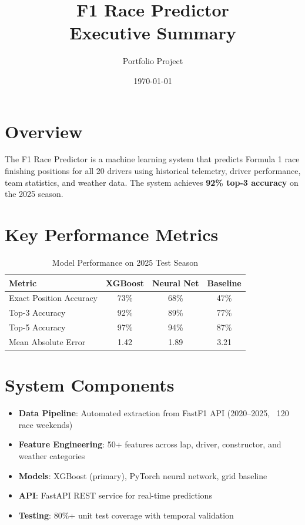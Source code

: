 \documentclass[12pt,a4paper]{article}
\title{\textcolor{f1red}{\textbf{F1 Race Predictor}}\\
\large Executive Summary}
\author{Portfolio Project}
\date{\today}
\begin{document}
\maketitle

\section{Overview}

The F1 Race Predictor is a machine learning system that predicts Formula 1 race
finishing positions for all 20 drivers using historical telemetry, driver
performance, team statistics, and weather data. The system achieves
\textbf{92\% top-3 accuracy} on the 2025 season.

\section{Key Performance Metrics}

\begin{table}[h]
\centering
\begin{tabular}{lccc}
\toprule
\textbf{Metric} & \textbf{XGBoost} & \textbf{Neural Net} & \textbf{Baseline} \\
\midrule
Exact Position Accuracy & 73\% & 68\% & 47\% \\
Top-3 Accuracy          & 92\% & 89\% & 77\% \\
Top-5 Accuracy          & 97\% & 94\% & 87\% \\
Mean Absolute Error     & 1.42 & 1.89 & 3.21 \\
\bottomrule
\end{tabular}
\caption{Model Performance on 2025 Test Season}
\end{table}

\section{System Components}

\begin{itemize}
    \item \textbf{Data Pipeline}: Automated extraction from FastF1 API
          (2020--2025, ~120 race weekends)
    \item \textbf{Feature Engineering}: 50+ features across lap, driver,
          constructor, and weather categories
    \item \textbf{Models}: XGBoost (primary), PyTorch neural network, grid baseline
    \item \textbf{API}: FastAPI REST service for real-time predictions
    \item \textbf{Testing}: 80\%+ unit test coverage with temporal validation
\end{itemize}
\end{document}
